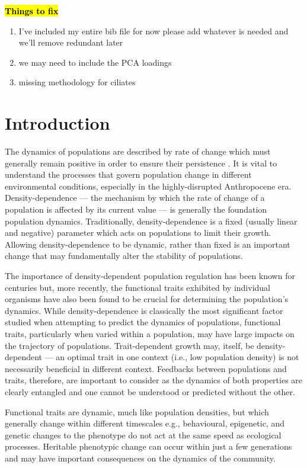\documentclass{getwriting}
\begin{document}


\pagebreak

\hl{\textbf{Things to fix}}
\begin{enumerate}
    \item I've included my entire bib file for now please add whatever is needed and we'll remove redundant later
    \item we may need to include the PCA loadings
    \item missing methodology for ciliates
\end{enumerate}

\section{Introduction}

The dynamics of populations are described by rate of change which must generally remain positive in order to ensure their persistence \cite{}. It is vital to understand the processes that govern population change in different environmental conditions, especially in the highly-disrupted Anthropocene era. Density-dependence --- the mechanism by which the rate of change of a population is affected by its current value --- is generally the foundation population dynamics. Traditionally, density-dependence is a fixed (usually linear and negative) parameter which acts on populations to limit their growth. Allowing density-dependence to be dynamic, rather than fixed is an important change that may fundamentally alter the stability of populations.

The importance of density-dependent population regulation has been known for centuries but, more recently, the functional traits exhibited by individual organisms have also been found to be crucial for determining the population’s dynamics. While density-dependence is classically the most significant factor studied when attempting to predict the dynamics of populations, functional traits, particularly when varied within a population, may have large impacts on the trajectory of populations. Trait-dependent growth may, itself, be density-dependent — an optimal trait in one context (i.e., low population density) is not necessarily beneficial in different context. Feedbacks between populations and traits, therefore, are important to consider as the dynamics of both properties are clearly entangled and one cannot be understood or predicted without the other.

Functional traits are dynamic, much like population densities, but which generally change within different timescales e.g., behavioural, epigenetic, and genetic changes to the phenotype do not act at the same speed as ecological processes. Heritable phenotypic change can occur within just a few generations and may have important consequences on the dynamics of the community.
\end{document}
